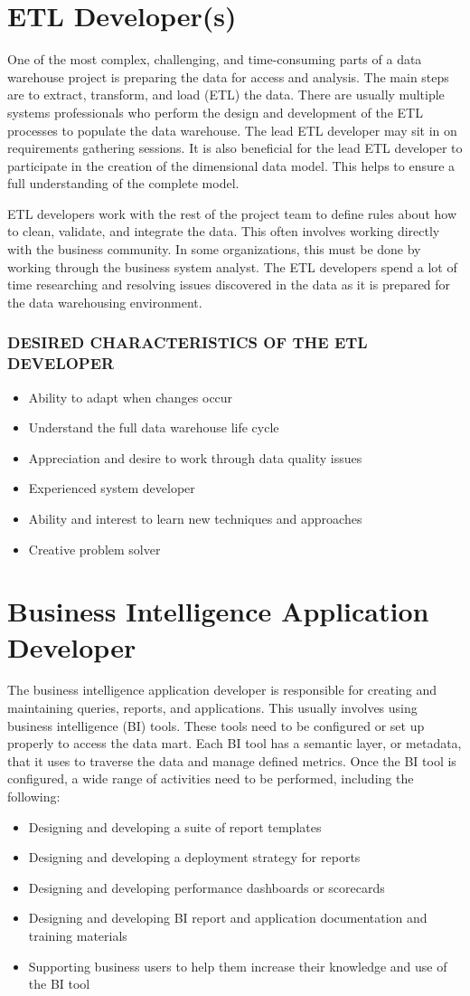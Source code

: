 \documentclass{vldb}
\newcommand{\bi}{\begin{itemize}}
\newcommand{\ei}{\end{itemize}}
\newcommand{\ii}{\item}
\begin{document}
\section{ETL Developer(s)}
One of the most complex, challenging, and time-consuming parts of a data warehouse project is preparing the data for access and analysis. The main steps are to extract, transform, and load (ETL) the data. There are usually multiple systems professionals who perform the design and development of the ETL processes to populate the data warehouse. The lead ETL developer may sit in on requirements gathering sessions. It is also beneficial for the lead ETL developer to participate in the creation of the dimensional data model. This helps to ensure a full understanding of the complete model.

ETL developers work with the rest of the project team to define rules about how to clean, validate, and integrate the data. This often involves working directly with the business community. In some organizations, this must be done by working through the business system analyst. The ETL developers spend a lot of time researching and resolving issues discovered in the data as it is prepared for the data warehousing environment.


\subsubsection*{DESIRED CHARACTERISTICS OF THE ETL DEVELOPER}

\bi
\ii Ability to adapt when changes occur
\ii Understand the full data warehouse life cycle
\ii Appreciation and desire to work through data quality issues 
\ii Experienced system developer
\ii Ability and interest to learn new techniques and approaches 
\ii Creative problem solver
\ei

\section{Business Intelligence Application Developer}
The business intelligence application developer is responsible for creating and maintaining queries, reports, and applications. This usually involves using business intelligence (BI) tools. These tools need to be configured or set up properly to access the data mart. Each BI tool has a semantic layer, or metadata, that it uses to traverse the data and manage defined metrics. Once the BI tool is configured, a wide range of activities need to be performed, including the following:
\bi
\ii Designing and developing a suite of report templates
\ii Designing and developing a deployment strategy for reports
\ii Designing and developing performance dashboards or scorecards
\ii Designing and developing BI report and application documentation and training materials
\ii Supporting business users to help them increase their knowledge and use of the BI tool
\ei
\end{document}
